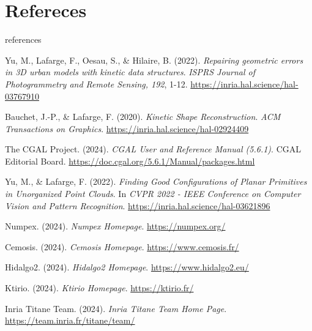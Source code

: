 \documentclass[10pt]{beamer}
\begin{document}
\section{Refereces}
\begin{frame}{references}
  \begin{thebibliography}{99}

    Yu, M., Lafarge, F., Oesau, S., \& Hilaire, B. (2022).
    \textit{Repairing geometric errors in 3D urban models with kinetic data structures}.
    \textit{ISPRS Journal of Photogrammetry and Remote Sensing, 192}, 1-12.
    \url{https://inria.hal.science/hal-03767910}
    
    Bauchet, J.-P., \& Lafarge, F. (2020).
    \textit{Kinetic Shape Reconstruction}.
    \textit{ACM Transactions on Graphics}.
    \url{https://inria.hal.science/hal-02924409}
    
    The CGAL Project. (2024).
    \textit{CGAL User and Reference Manual (5.6.1)}.
    CGAL Editorial Board.
    \url{https://doc.cgal.org/5.6.1/Manual/packages.html}
    
    Yu, M., \& Lafarge, F. (2022).
    \textit{Finding Good Configurations of Planar Primitives in Unorganized Point Clouds}.
    In \textit{CVPR 2022 - IEEE Conference on Computer Vision and Pattern Recognition}.
    \url{https://inria.hal.science/hal-03621896}
  \end{thebibliography}

\end{frame}

\begin{frame}
  \begin{thebibliography}{widestlabel}
Numpex. (2024).
\textit{Numpex Homepage}.
\url{https://numpex.org/}

Cemosis. (2024).
\textit{Cemosis Homepage}.
\url{https://www.cemosis.fr/}

Hidalgo2. (2024).
\textit{Hidalgo2 Homepage}.
\url{https://www.hidalgo2.eu/}

Ktirio. (2024).
\textit{Ktirio Homepage}.
\url{https://ktirio.fr/}

Inria Titane Team. (2024).
\textit{Inria Titane Team Home Page}.
\url{https://team.inria.fr/titane/team/}

\end{thebibliography}
\end{frame}
\end{document}
